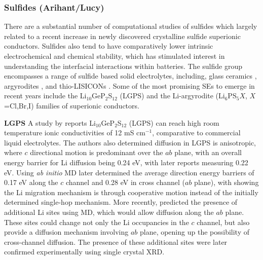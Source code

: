 \documentclass[../main.tex]{subfiles}
\begin{document}
\subsubsection{Sulfides (Arihant/Lucy)}
There are a substantial number of computational studies of sulfides which largely related to a recent increase in newly discovered crystalline sulfide superionic conductors. Sulfides also tend to have comparatively lower intrinsic electrochemical and chemical stability, which has stimulated interest in understanding the interfacial interactions within batteries. \cite{Xiao2020interfacerev} The sulfide group encompasses a range of sulfide based solid electrolytes, including, glass ceramics \cite{minami2006recent}, argyrodites \cite{bai2020research}, and thio-LISICONs \cite{minafra2020two}. Some of the most promising SEs to emerge in recent years include the Li$_{10}$GeP$_2$S$_{12}$ (LGPS) \cite{Bhandari2016,Kamaya2011,Mo2012} and the Li-argyrodite (Li$_6$PS$_{5}X$, $X$=Cl,Br,I) \cite{kraft2018,deiseroth_li6ps5x_2008,deklerk2016,kraft2017,minafra2018,adeli2019} families of superionic conductors.

\textbf{LGPS}
A study by \citeauthor{Kamaya2011} reports Li$_{10}$GeP$_2$S$_{12}$ (LGPS) can reach high room temperature ionic conductivities of 12 mS cm$^{-1}$, comparative to commercial liquid electrolytes.\cite{Kamaya2011} The authors also determined diffusion in LGPS is anisotropic, where $c$ directional motion is predominant over the $ab$ plane, with an overall energy barrier for Li diffusion being 0.24 eV, with later reports measuring 0.22 eV.\cite{Kuhn2013b} Using \textit{ab initio} MD \citeauthor{Mo2012} later determined the average direction energy barriers of 0.17 eV along the $c$ channel and 0.28 eV in cross channel ($ab$ plane), \cite{Mo2012} with \citeauthor{Xu2012one} showing the Li migration mechanism is through cooperative motion instead of the initially determined single-hop mechanism.\cite{Xu2012one} More recently, \citeauthor{Adams2012} predicted the presence of additional Li sites using MD, which would allow diffusion along the $ab$ plane.\cite{Adams2012} These sites could change not only the Li occupancies in the $c$ channel, but also provide a diffusion mechanism involving $ab$ plane, opening up the possibility of cross-channel diffusion. The presence of these additional sites were later confirmed experimentally using single crystal XRD.\cite{Kuhn2013a}
\end{document}
